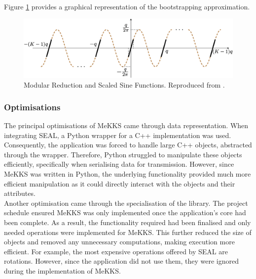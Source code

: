 \smallskip \\ \indent
Figure \ref{fig:bootstrapping} provides a graphical representation of the bootstrapping approximation.
\begin{figure}[ht]
    \centering
    \includegraphics[scale=0.3]{figures/bootstrapping.png}
    \caption[Bootstrapping Procedure]{Modular Reduction and Scaled Sine Functions. Reproduced from \cite{BootstrappingHEAAN}.}
    \label{fig:bootstrapping}
\end{figure}

\setlength{\leftskip}{0cm}
\subsubsection{Optimisations}
\setlength{\leftskip}{0.5cm}
\indent \indent
The principal optimisations of MeKKS came through data representation. When integrating SEAL, a Python wrapper for a C++ implementation was used. Consequently, the application was forced to handle large C++ objects, abstracted through the wrapper. Therefore, Python struggled to manipulate these objects efficiently, specifically when serialising data for transmission. However, since MeKKS was written in Python, the underlying functionality provided much more efficient manipulation as it could directly interact with the objects and their attributes.
\smallskip \\ \indent
Another optimisation came through the specialisation of the library. The project schedule ensured MeKKS was only implemented once the application's core had been complete. As a result, the functionality required had been finalised and only needed operations were implemented for MeKKS. This further reduced the size of objects and removed any unnecessary computations, making execution more efficient. For example, the most expensive operations offered by SEAL are rotations. However, since the application did not use them, they were ignored during the implementation of MeKKS.

\setlength{\leftskip}{0cm}



